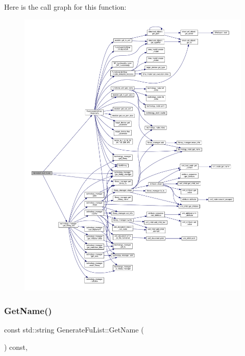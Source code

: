 Here is the call graph for this function\+:
\nopagebreak
\begin{figure}[H]
\begin{center}
\leavevmode
\includegraphics[width=350pt]{db/dea/classGenerateFuList_adadbe6658c33d77bb24fd0e8b1516a65_cgraph}
\end{center}
\end{figure}
\mbox{\label{classGenerateFuList_a0b6efa299b9de2bc45157d9e28a97a9e}} 
\subsubsection{\texorpdfstring{Get\+Name()}{GetName()}}
{\footnotesize\ttfamily const std\+::string Generate\+Fu\+List\+::\+Get\+Name (\begin{DoxyParamCaption}{ }\end{DoxyParamCaption}) const\hspace{0.3cm}{\ttfamily [override]}, {\ttfamily [virtual]}}



